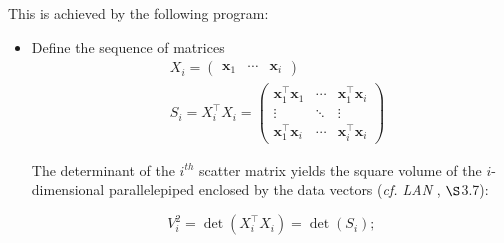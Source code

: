 \documentclass[12pt, twoside, draft]{article}
\begin{document}
This is achieved by the following program:
\begin{itemize}
\item Define the sequence of matrices
\begin{align}
&X_i = \begin{pmatrix} \mathbf{x}_1 &\cdots & \mathbf{x}_i \end{pmatrix} \\
&S_i = X_i^\top X_i = 
\begin{pmatrix} \mathbf{x}_1^\top \mathbf{x}_1 & \cdots & \mathbf{x}_1^\top \mathbf{x}_i \\ 
\vdots & \ddots & \vdots \\
\mathbf{x}_1^\top \mathbf{x}_i & \cdots & \mathbf{x}_i^\top \mathbf{x}_i \end{pmatrix}
\end{align}

The determinant of the $i^{th}$ scatter matrix yields the square volume of the $i$-dimensional parallelepiped enclosed by the data vectors (\textit{cf. LAN }, $\S$3.7):

\begin{equation}
V_i^2 = \operatorname{det} (X_i^\top X_i) = \operatorname{det} (S_i);
\end{equation}


\end{itemize}
\end{document}
